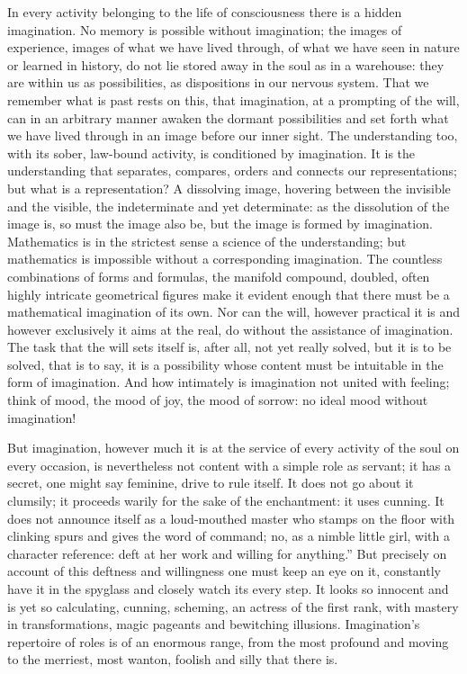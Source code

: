 \documentclass[12pt,a4paper,openany]{book}
\newcommand{\opage}[1]{\marginnote{\footnotesize\textit{[#1]}}}
\begin{document}
In every activity belonging to the life of consciousness there is a hidden imagination. No memory is possible without imagination; the images of experience, images of what we have lived through, of what we have seen in nature or learned in history, do not lie stored away in the soul as in a warehouse: they are within us as possibilities, as dispositions in our nervous system. That we remember what is past rests on this, that imagination, at a prompting of the will, can in an arbitrary manner awaken the dormant possibilities and set forth what we have lived through in an image before our inner sight. The understanding too, with its sober, law-bound activity, is conditioned by imagination. It is the understanding that separates, compares, orders and connects our representations; but what is a representation? A dissolving image, hovering between the invisible and the visible, the indeterminate and yet determinate: as the dissolution of the image is, so must
\setcounter{footnote}{0}%
\opage{76}the image also be, but the image is formed by imagination. Mathematics is in the strictest sense a science of the understanding; but mathematics is impossible without a corresponding imagination. The countless combinations of forms and formulas, the manifold compound, doubled, often highly intricate geometrical figures make it evident enough that there must be a mathematical imagination of its own. Nor can the will, however practical it is and however exclusively it aims at the real, do without the assistance of imagination. The task that the will sets itself is, after all, not yet really solved, but it is to be solved, that is to say, it is a possibility whose content must be intuitable in the form of imagination. And how intimately is imagination not united with feeling; think of mood, the mood of joy, the mood of sorrow: no ideal mood without imagination!

But imagination, however much it is at the service of every activity of the soul on every occasion, is nevertheless not content with a simple role as servant; it has a secret, one might say feminine, drive to rule itself. It does not go about it clumsily; it proceeds warily for the sake of the enchantment: it uses cunning. It does not announce itself as a loud-mouthed master who stamps on the floor with clinking spurs and gives the word of command; no, as a nimble little girl, with a character reference: deft at her work and willing for anything.'' But precisely on account of this deftness and willingness one must keep an eye on it, constantly have it in the spyglass and closely watch its every step. It looks so innocent and is yet so calculating, cunning, scheming, an actress of the first rank, with mastery in transformations, magic pageants and bewitching illusions.
\setcounter{footnote}{0}%
\opage{77}Imagination's repertoire of roles is of an enormous range, from the most profound and moving to the merriest, most wanton, foolish and silly that there is.
\end{document}
